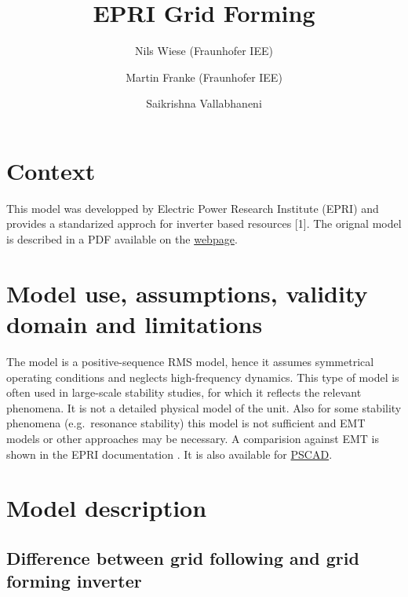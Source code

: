 \documentclass[
  a4paper,
  DIV=11,
  numbers=noendperiod]{scrartcl}
\title{EPRI Grid Forming}
\author{Nils Wiese (Fraunhofer IEE) \and Martin Franke (Fraunhofer
IEE) \and Saikrishna Vallabhaneni}
\date{}
\renewcommand*\contentsname{Table of contents}
\newcommand\contentsname{Table of contents}
\begin{document}
\maketitle

\renewcommand*\contentsname{Table of contents}
{
\hypersetup{linkcolor=}
\setcounter{tocdepth}{3}
\tableofcontents
}
\listoffigures
\listoftables

\section{Context}\label{context}

This model was developped by Electric Power Research Institute (EPRI)
and provides a standarized approch for inverter based resources {[}1{]}.
The orignal model is described in a PDF available on the
\href{https://www.epri.com/research/products/000000003002021403}{webpage}.

\section{Model use, assumptions, validity domain and
limitations}\label{model-use-assumptions-validity-domain-and-limitations}

The model is a positive-sequence RMS model, hence it assumes symmetrical
operating conditions and neglects high-frequency dynamics. This type of
model is often used in large-scale stability studies, for which it
reflects the relevant phenomena. It is not a detailed physical model of
the unit. Also for some stability phenomena (e.g.~resonance stability)
this model is not sufficient and EMT models or other approaches may be
necessary. A comparision against EMT is shown in the EPRI documentation
. It is also available for
\href{https://www.pscad.com/knowledge-base/download/PSCAD-EPRI-Generic-GFM.pdf&ved=2ahUKEwjOpr_z0rOKAxVPg_0HHUO_JAgQFnoECBoQAQ&usg=AOvVaw1LVPVn2jXqTdzbFxeCoPo7}{PSCAD}.

\section{Model description}\label{model-description}

\subsection{Difference between grid following and grid forming
inverter}\label{difference-between-grid-following-and-grid-forming-inverter}
\end{document}
